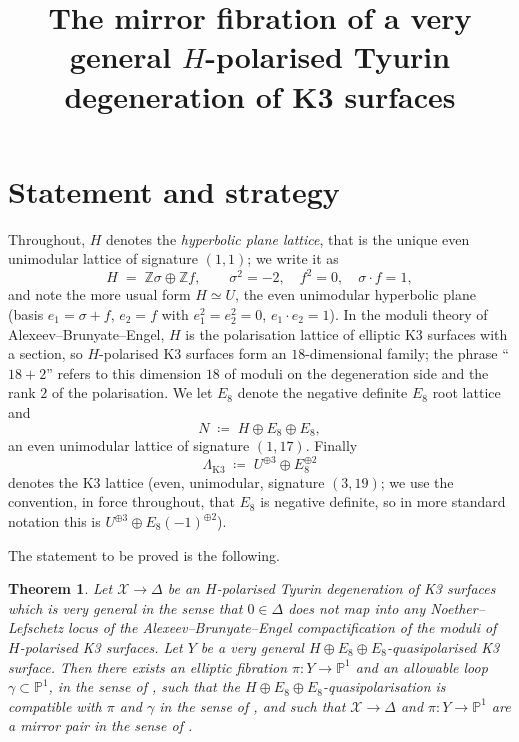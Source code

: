 \documentclass[11pt]{article}
\title{The mirror fibration of a very general $H$-polarised Tyurin
degeneration of K3 surfaces}
\date{}
\newtheorem{theorem}{Theorem}[section]
\newcommand{\X}{\mathcal{X}}
\newcommand{\D}{\Delta}
\newcommand{\PP}{\mathbb{P}}
\newcommand{\bZ}{\mathbb{Z}}
\begin{document}
\maketitle

\section{Statement and strategy}

Throughout, $H$ denotes the \emph{hyperbolic plane lattice}, that is the
unique even unimodular lattice of signature $(1,1)$; we write it as
\[
H \;=\; \bZ\sigma \oplus \bZ f,\qquad
\sigma^2 = -2,\quad f^2=0,\quad \sigma\cdot f = 1,
\]
and note the more usual form $H\simeq U$, the even unimodular hyperbolic
plane (basis $e_1 = \sigma+f$, $e_2 = f$ with $e_1^2=e_2^2=0$,
$e_1\cdot e_2 = 1$). In the moduli theory of Alexeev--Brunyate--Engel, $H$
is the polarisation lattice of elliptic K3 surfaces with a section, so
$H$-polarised K3 surfaces form an $18$-dimensional family; the phrase
``$18+2$'' refers to this dimension $18$ of moduli on the degeneration side
and the rank $2$ of the polarisation. We let $E_8$ denote the negative
definite $E_8$ root lattice and
\[
N \;\coloneqq\; H \oplus E_8 \oplus E_8,
\]
an even unimodular lattice of signature $(1,17)$. Finally
\[
\Lambda_{\mathrm{K3}} \;\coloneqq\; U^{\oplus 3}\oplus E_8^{\oplus 2}
\]
denotes the K3 lattice (even, unimodular, signature $(3,19)$; we use the
convention, in force throughout, that $E_8$ is negative definite, so in
more standard notation this is
$U^{\oplus3}\oplus E_8(-1)^{\oplus2}$).

The statement to be proved is the following.

\begin{theorem}\label{thm:main}
Let $\X\to\D$ be an $H$-polarised Tyurin degeneration of K3 surfaces which is
very general in the sense that $0\in\D$ does not map into any
Noether--Lefschetz locus of the Alexeev--Brunyate--Engel compactification of
the moduli of $H$-polarised K3 surfaces. Let $Y$ be a very general $H\oplus
E_8\oplus E_8$-quasipolarised K3 surface. Then there exists an elliptic
fibration $\pi\colon Y\to\PP^1$ and an allowable loop
$\gamma\subset\PP^1$, in the sense of {\upshape[GT, Definition 4.11]}, such
that the $H\oplus E_8\oplus E_8$-quasipolarisation is compatible with $\pi$
and $\gamma$ in the sense of {\upshape[GT, Definition 4.21]}, and such that
$\X\to\D$ and $\pi\colon Y\to\PP^1$ are a mirror pair in the sense of
{\upshape[GT, Definition 5.1]}.
\end{theorem}
\end{document}

